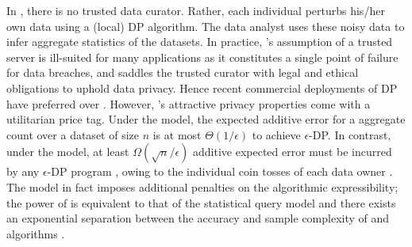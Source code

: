 In \ldp, there is no trusted data curator. Rather, each individual perturbs his/her own data using a (local) DP algorithm. The data analyst uses these noisy data to infer aggregate statistics of the datasets. In practice, \cdp's assumption of a trusted server is ill-suited for many applications as it constitutes a single point of failure for data breaches, and saddles the trusted curator with legal and ethical obligations to uphold data privacy. %
Hence recent commercial deployments of DP  \cite{Rappor1, Apple} have preferred  \ldp over \cdp. However, \ldp's attractive privacy properties come with a utilitarian price tag. %
Under the \cdp model, the expected additive error for a aggregate count over a dataset of size $n$ is at most $\Theta(1/\epsilon)$ to achieve $\epsilon$-DP. %
In contrast, under the \ldp model, at least $\Omega(\sqrt{n}/\epsilon)$ additive expected error must be incurred by any $\epsilon$-DP program \cite{error1,error2,error3}, owing to the individual coin tosses of each data owner \cite{Prochlo,Rappor1,Rappor2,LDP1}. The \ldp model in fact imposes additional penalties on the algorithmic expressibility;  the power of \ldp is equivalent to that of the statistical query model \cite{SQ1} and there exists an exponential separation between the accuracy and sample complexity of \ldp and \cdp algorithms \cite{Kasivi}. 
 
